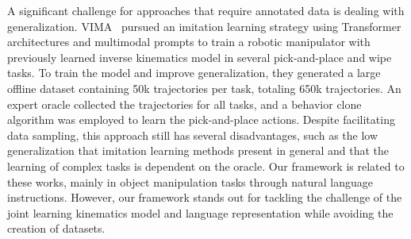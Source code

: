 A significant challenge for approaches that require annotated data is dealing with generalization. VIMA~\cite{jiang2022vima} pursued an imitation learning strategy using Transformer architectures and multimodal prompts to train a robotic manipulator with previously learned inverse kinematics model in several pick-and-place and wipe tasks. To train the model and improve generalization, they generated a large offline dataset containing 50k trajectories per task, totaling 650k trajectories. An expert oracle collected the trajectories for all tasks, and a behavior clone algorithm was employed to learn the pick-and-place actions. Despite facilitating data sampling, this approach still has several disadvantages, such as the low generalization that imitation learning methods present in general and that the learning of complex tasks is dependent on the oracle. Our framework is related to these works, mainly in object manipulation tasks through natural language instructions. However, our framework stands out for tackling the challenge of the joint learning kinematics model and language representation while avoiding the creation of datasets.